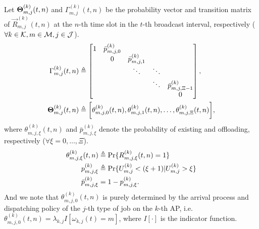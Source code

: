 \begin{definition}
    Let $\boldsymbol{\Theta}^{(k)}_{m,j}(t,n)$ and ${\Gamma}^{(k)}_{m,j}(t,n)$ be the probability vector and transition matrix of $\vec{R}^{(k)}_{m,j}(t,n)$ at the $n$-th time slot in the $t$-th broadcast interval, respectively ($\forall k\in\mathcal{K}, m\in\mathcal{M}, j\in\mathcal{J}$).
    \begin{align}
        \Gamma^{(k)}_{m,j}(t,n) &\triangleq
        \begin{bmatrix}
            1 & \bar{p}^{(k)}_{m,j,0} &                       &        &                           \\
            & 0                     & \bar{p}^{(k)}_{m,j,1} &        &                           \\
            &                       & \ddots                & \ddots &                           \\
            &                       &                       & \ddots & \bar{p}^{(k)}_{m,j,\Xi-1} \\
            &                       &                       &        & 0                         \\
        \end{bmatrix},
        \\
        \boldsymbol{\Theta}^{(k)}_{m,j}(t,n) &\triangleq
        \bigg[ \theta^{(k)}_{m,j,0}(t,n), \theta^{(k)}_{m,j,1}(t,n), \dots, \theta^{(k)}_{m,j,\Xi}(t,n) \bigg],
    \end{align}
    where $\theta^{(k)}_{m,j,\xi}(t,n)$ and $\bar{p}^{(k)}_{m,j,\xi}$ denote the probability of existing and offloading, respectively ($\forall \xi=0,\dots,\Xi$).
    \begin{align}
        \theta^{(k)}_{m,j,\xi}(t,n) &\triangleq \Pr\{R^{(k)}_{m,j,\xi}(t,n) = 1\}
        \\
        p^{(k)}_{m,j,\xi} &\triangleq \Pr\{U^{(k)}_{m,j} < (\xi+1) | U^{(k)}_{m,j}>\xi\}
        \\
        \bar{p}^{(k)}_{m,j,\xi} &= 1 - p^{(k)}_{m,j,\xi}.
    \end{align}
    And we note that $\theta^{(k)}_{m,j,0}(t,n)$ is purely determined by the arrival process and dispatching policy of the $j$-th type of job on the $k$-th AP, i.e. $\theta^{(k)}_{m,j,0}(t,n) = \lambda_{k,j} I[\omega_{k,j}(t) = m]$, where $I[\cdot]$ is the indicator function.


\end{definition}
